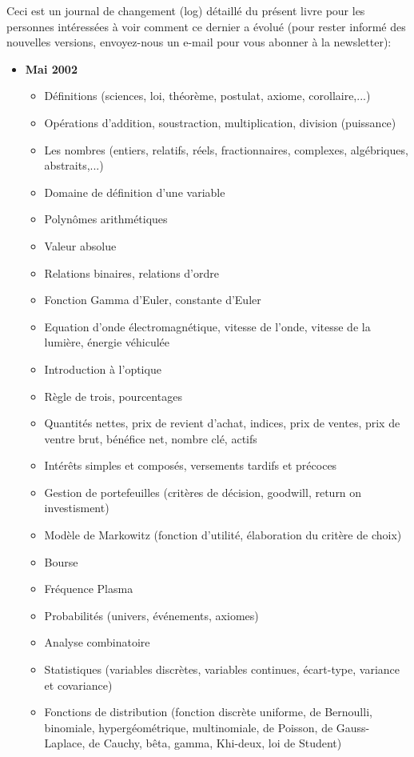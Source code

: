 Ceci est un journal de changement (log) détaillé du présent livre pour les personnes intéressées à voir comment ce dernier a évolué (pour rester informé des nouvelles versions, envoyez-nous un e-mail pour vous abonner à la newsletter):
	\begin{itemize}
		\item \textbf{Mai 2002}
		\begin{itemize}[noitemsep]
			\item Définitions (sciences, loi, théorème, postulat, axiome, corollaire,...)
			\item Opérations d'addition, soustraction, multiplication, division (puissance)
			\item Les nombres (entiers, relatifs, réels, fractionnaires, complexes, algébriques, abstraits,...)
			\item Domaine de définition d'une variable
			\item Polynômes arithmétiques
			\item Valeur absolue
			\item Relations binaires, relations d'ordre
			\item Fonction Gamma d'Euler, constante d'Euler
			\item Equation d'onde électromagnétique, vitesse de l'onde, vitesse de la lumière, énergie véhiculée
			\item Introduction à l'optique
			\item Règle de trois, pourcentages
			\item Quantités nettes, prix de revient d'achat, indices, prix de ventes, prix de ventre brut, bénéfice net, nombre clé, actifs
			\item Intérêts simples et composés, versements tardifs et précoces
			\item Gestion de portefeuilles (critères de décision, goodwill, return on investisment)
			\item Modèle de Markowitz (fonction d'utilité, élaboration du critère de choix)
			\item Bourse
			\item Fréquence Plasma
			\item Probabilités (univers, événements, axiomes)
			\item Analyse combinatoire 
			\item Statistiques (variables discrètes, variables continues, écart-type, variance et covariance)
			\item Fonctions de distribution (fonction discrète uniforme, de Bernoulli, binomiale, hypergéométrique, multinomiale, de Poisson, de Gauss-Laplace, de Cauchy, bêta, gamma, Khi-deux, loi de Student)

\end{itemize}
\end{itemize}
